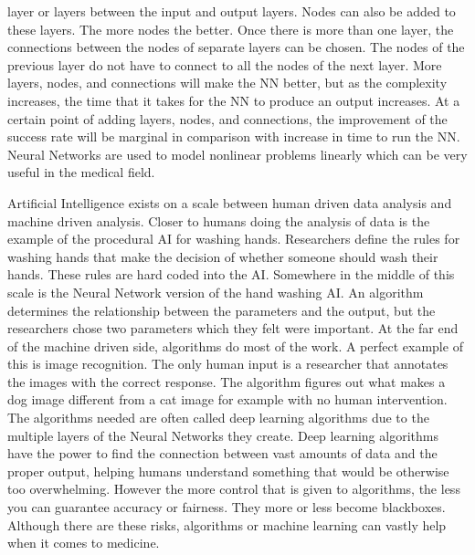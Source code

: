 \documentclass[]{article}
\begin{document}
layer or layers between the input and output layers. Nodes can also be added to these layers. The more nodes the better. Once there is more than one layer, the connections between the nodes of separate layers can be chosen. The nodes of the previous layer do not have to connect to all the nodes of the next layer. More layers, nodes, and connections will make the NN better, but as the complexity increases, the time that it takes for the NN to produce an output increases. At a certain point of adding layers, nodes, and connections, the improvement of the success rate will be marginal in comparison with increase in time to run the NN. Neural Networks are used to model nonlinear problems linearly which can be very useful in the medical field.\cite{introtoneuralnets}
		
		Artificial Intelligence exists on a scale between human driven data analysis and machine driven analysis. Closer to humans doing the analysis of data is the example of the procedural AI for washing hands. Researchers define the rules for washing hands that make the decision of whether someone should wash their hands. These rules are hard coded into the AI. Somewhere in the middle of this scale is the Neural Network version of the hand washing AI. An algorithm determines the relationship between the parameters and the output, but the researchers chose two parameters which they felt were important. At the far end of the machine driven side, algorithms do most of the work. A perfect example of this is image recognition. The only human input is a researcher that annotates the images with the correct response. The algorithm figures out what makes a dog image different from a cat image for example with no human intervention. The algorithms needed are often called deep learning algorithms due to the multiple layers of the Neural Networks they create. Deep learning algorithms have the power to find the connection between vast amounts of data and the proper output, helping humans understand something that would be otherwise too overwhelming. However the more control that is given to algorithms, the less you can guarantee accuracy or fairness. They more or less become blackboxes. Although there are these risks, algorithms or machine learning can vastly help when it comes to medicine.\cite{10.1001/jama.2017.18391}
		
\end{document}
